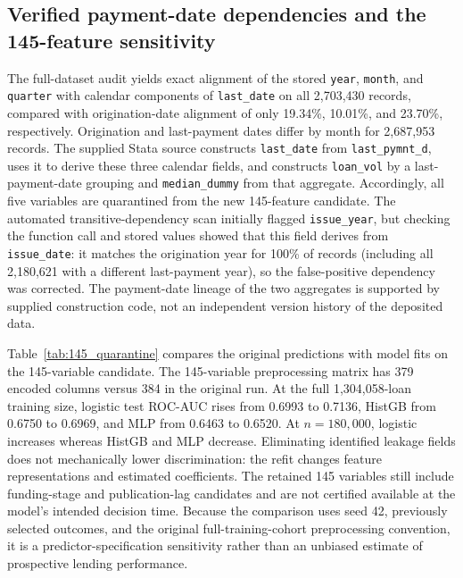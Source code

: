 \documentclass[10pt]{article}
\begin{document}
\subsection{Verified payment-date dependencies and the 145-feature sensitivity}
\label{sec:paymentdateaudit}
The full-dataset audit yields exact alignment of the stored \texttt{year}, \texttt{month}, and \texttt{quarter} with calendar components of \texttt{last\_date} on all 2,703,430 records, compared with origination-date alignment of only 19.34\%, 10.01\%, and 23.70\%, respectively. Origination and last-payment dates differ by month for 2,687,953 records. The supplied Stata source constructs \texttt{last\_date} from \texttt{last\_pymnt\_d}, uses it to derive these three calendar fields, and constructs \texttt{loan\_vol} by a last-payment-date grouping and \texttt{median\_dummy} from that aggregate. Accordingly, all five variables are quarantined from the new 145-feature candidate. The automated transitive-dependency scan initially flagged \texttt{issue\_year}, but checking the function call and stored values showed that this field derives from \texttt{issue\_date}: it matches the origination year for 100\% of records (including all 2,180,621 with a different last-payment year), so the false-positive dependency was corrected. The payment-date lineage of the two aggregates is supported by supplied construction code, not an independent version history of the deposited data.

Table~\ref{tab:145_quarantine} compares the original predictions with model fits on the 145-variable candidate. The 145-variable preprocessing matrix has 379 encoded columns versus 384 in the original run. At the full 1,304,058-loan training size, logistic test ROC-AUC rises from 0.6993 to 0.7136, HistGB from 0.6750 to 0.6969, and MLP from 0.6463 to 0.6520. At $n=180{,}000$, logistic increases whereas HistGB and MLP decrease. Eliminating identified leakage fields does not mechanically lower discrimination: the refit changes feature representations and estimated coefficients. The retained 145 variables still include funding-stage and publication-lag candidates and are not certified available at the model's intended decision time. Because the comparison uses seed 42, previously selected outcomes, and the original full-training-cohort preprocessing convention, it is a predictor-specification sensitivity rather than an unbiased estimate of prospective lending performance.
\end{document}
